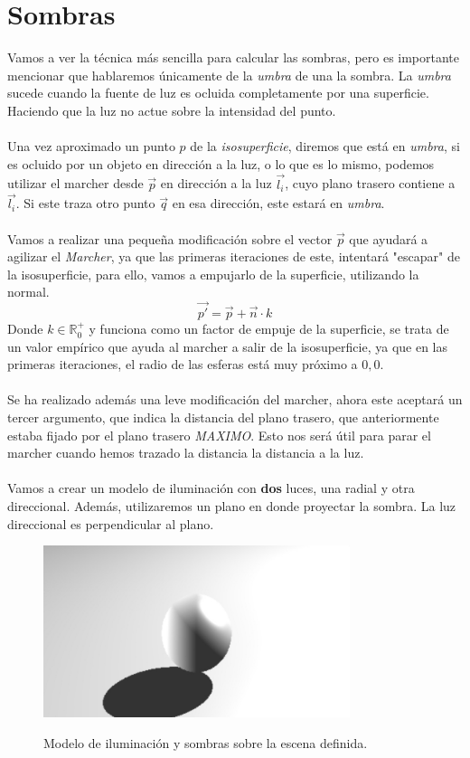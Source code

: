 \section{Sombras}
Vamos a ver la técnica más sencilla para calcular las sombras, pero es importante mencionar que hablaremos únicamente de la \textit{umbra} de una la sombra. La \textit{umbra} sucede cuando la fuente de luz es ocluida completamente por una superficie. Haciendo que la luz no actue sobre la intensidad del punto.\\\\Una vez aproximado un punto \(p\) de la \textit{isosuperficie}, diremos que está en \textit{umbra}, si es ocluido por un objeto en dirección a la luz, o lo que es lo mismo, podemos utilizar el marcher desde \(\Vec{p}\) en dirección a la luz \(\Vec{l_i}\), cuyo plano trasero contiene a \(\Vec{l_i}\). Si este traza otro punto \(\Vec{q}\) en esa dirección, este estará en \textit{umbra}.\\\\
Vamos a realizar una pequeña modificación sobre el vector \(\Vec{p}\) que ayudará a agilizar el \textit{Marcher}, ya que las primeras iteraciones de este, intentará "escapar" de la isosuperficie, para ello, vamos a empujarlo de la superficie, utilizando la normal.
\[\Vec{p'}=\Vec{p} + \Vec{n} \cdot k\]
Donde \(k\in\mathbb{R}^{+}_{0}\) y funciona como un factor de empuje de la superficie, se trata de un valor empírico que ayuda al marcher a salir de la isosuperficie, ya que en las primeras iteraciones, el radio de las esferas está muy próximo a \(0,0\). \\\\
Se ha realizado además una leve modificación del marcher, ahora este aceptará un tercer argumento, que indica la distancia del plano trasero, que anteriormente estaba fijado por el plano trasero \textit{MAXIMO}. Esto nos será útil para parar el marcher cuando hemos trazado la distancia la distancia a la luz.\\\\
Vamos a crear un modelo de iluminación con \textbf{dos} luces, una radial y otra direccional. Además, utilizaremos un plano en donde proyectar la sombra. La luz direccional es perpendicular al plano.
\begin{figure}[H]
  \centering
  \captionsetup{justification=centering}%
  \includegraphics[width=0.8\textwidth]{secciones/imagenes/sombra_dura.jpeg}\label{fig:shadow}
  \caption{Modelo de iluminación y sombras sobre la escena definida.}
\end{figure}
